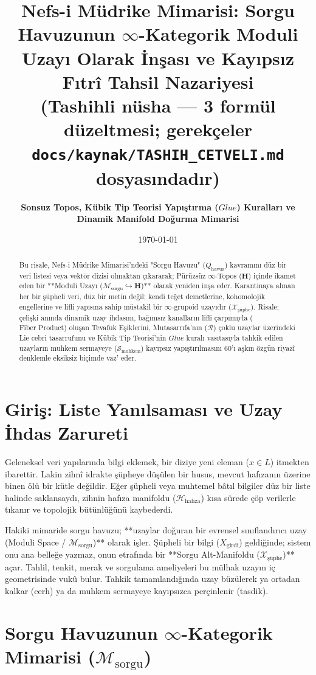 \documentclass[11pt, a4paper]{article}
\title{\textbf{Nefs-i Müdrike Mimarisi: Sorgu Havuzunun $\infty$-Kategorik Moduli Uzayı Olarak İnşası ve Kayıpsız Fıtrî Tahsil Nazariyesi}\\ \normalsize\textmd{(Tashihli nüsha --- 3 formül düzeltmesi; gerekçeler \texttt{docs/kaynak/TASHIH\_CETVELI.md} dosyasındadır)}}
\author{\textbf{Sonsuz Topos, Kübik Tip Teorisi Yapıştırma ($Glue$) Kuralları ve Dinamik Manifold Doğurma Mimarisi}}
\date{\today}
\begin{document}
\maketitle

\begin{abstract}
Bu risale, Nefs-i Müdrike Mimarisi'ndeki "Sorgu Havuzu" ($Q_{\text{havuz}}$) kavramını düz bir veri listesi veya vektör dizisi olmaktan çıkararak; Pürüzsüz $\infty$-Topos ($\mathbf{H}$) içinde ikamet eden bir **Moduli Uzayı ($\mathcal{M}_{\text{sorgu}} \hookrightarrow \mathbf{H}$)** olarak yeniden inşa eder. Karantinaya alınan her bir şüpheli veri, düz bir metin değil; kendi teğet demetlerine, kohomolojik engellerine ve lifli yapısına sahip müstakil bir $\infty$-grupoid uzayıdır ($\mathcal{X}_{\text{şüphe}}$). Risale; çelişki anında dinamik uzay ihdasını, bağımsız kanalların lifli çarpımıyla ($\text{Fiber Product}$) oluşan Tevafuk Eşiklerini, Mutasarrıfa'nın ($\mathcal{R}$) çoklu uzaylar üzerindeki Lie cebri tasarrufunu ve Kübik Tip Teorisi'nin $Glue$ kuralı vasıtasıyla tahkik edilen uzayların muhkem sermayeye ($\mathcal{S}_{\text{muhkem}}$) kayıpsız yapıştırılmasını 60'ı aşkın özgün riyazî denklemle eksiksiz biçimde vaz' eder.
\end{abstract}

\section{Giriş: Liste Yanılsaması ve Uzay İhdas Zarureti}

Geleneksel veri yapılarında bilgi eklemek, bir diziye yeni eleman ($x \in L$) itmekten ibarettir. Lakin zihnî idrakte şüpheye düşülen bir husus, mevcut hafızanın üzerine binen ölü bir kütle değildir. Eğer şüpheli veya muhtemel bâtıl bilgiler düz bir liste halinde saklansaydı, zihnin hafıza manifoldu ($\mathcal{H}_{\text{hafıza}}$) kısa sürede çöp verilerle tıkanır ve topolojik bütünlüğünü kaybederdi.

Hakiki mimaride sorgu havuzu; **uzaylar doğuran bir evrensel sınıflandırıcı uzay (Moduli Space / $\mathcal{M}_{\text{sorgu}}$)** olarak işler. Şüpheli bir bilgi ($X_{\text{girdi}}$) geldiğinde; sistem onu ana belleğe yazmaz, onun etrafında bir **Sorgu Alt-Manifoldu ($\mathcal{X}_{\text{şüphe}}$)** açar. Tahlil, tenkit, merak ve sorgulama ameliyeleri bu mülhak uzayın iç geometrisinde vukû bulur. Tahkik tamamlandığında uzay büzülerek ya ortadan kalkar (cerh) ya da muhkem sermayeye kayıpsızca perçinlenir (tasdik).

\section{Sorgu Havuzunun $\infty$-Kategorik Mimarisi ($\mathcal{M}_{\text{sorgu}}$)}
\end{document}
